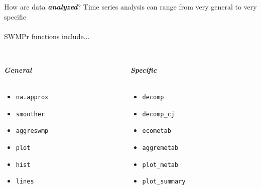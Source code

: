 \documentclass[serif]{beamer}\usepackage[]{graphicx}\usepackage[]{color}
\newcommand{\Bigtxt}[1]{\textbf{\textit{#1}}}
\begin{document}
\begin{frame}{How are data \Bigtxt{analyzed}?}
Time series analysis can range from very general to very specific \\~\\
SWMPr functions include...\\~\\
\begin{columns}
\begin{column}{0.45\textwidth}
\Bigtxt{General} \\~\\
\begin{itemize}
\item \texttt{na.approx}
\item \texttt{smoother}
\item \texttt{aggreswmp}
\item \texttt{plot}
\item \texttt{hist}
\item \texttt{lines}
\end{itemize}
\end{column}
\begin{column}{0.45\textwidth}
\Bigtxt{Specific} \\~\\
\begin{itemize}
\item \texttt{decomp}
\item \texttt{decomp\_cj}
\item \texttt{ecometab}
\item \texttt{aggremetab}
\item \texttt{plot\_metab}
\item \texttt{plot\_summary}
\end{itemize}
\end{column}
\end{columns}
\end{frame}
\end{document}
